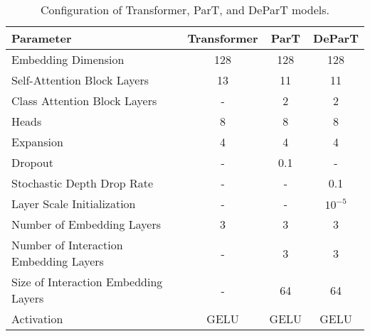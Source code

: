 \begin{table}[h]
    \centering
    \caption{Configuration of Transformer, ParT, and DeParT models.} 
    \label{tab:trans_config}
    \begin{tabular}{@{}lccc@{}}
    \toprule
    \textbf{Parameter} & \textbf{Transformer} & \textbf{ParT} & \textbf{DeParT} \\ \midrule
    Embedding Dimension & 128 & 128 & 128 \\
    Self-Attention Block Layers & 13 & 11 & 11 \\
    Class Attention Block Layers & - & 2 & 2 \\
    Heads & 8 & 8 & 8 \\
    Expansion & 4 & 4 & 4 \\
    Dropout & - & 0.1 & - \\
    Stochastic Depth Drop Rate & - & - & 0.1 \\
    Layer Scale Initialization & - & - & $10^{-5}$ \\
    Number of Embedding Layers & 3 & 3 & 3 \\
    Number of Interaction Embedding Layers & - & 3 & 3 \\
    Size of Interaction Embedding Layers & - & 64 & 64 \\
    Activation & GELU & GELU & GELU \\
    \bottomrule
    \end{tabular}
    \end{table}